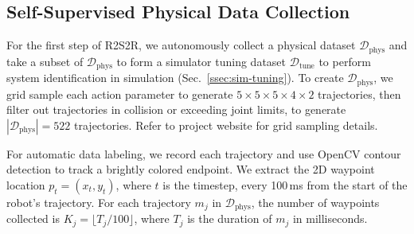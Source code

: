 \documentclass[letterpaper, 10pt, conference]{ieeeconf}  %
\newcommand{\vmax}{v_{\rm max}}
\newcommand{\dtune}{\mathcal{D}_\textrm{tune}}
\newcommand{\dsim}{\mathcal{D}_\textrm{sim}}
\newcommand{\dreal}{\mathcal{D}_\textrm{phys}}
\newcommand{\remark}[3]{{\color{#2}[#1: #3]}}
\newcommand{\Vincent}[1]{\remark{Vincent}{purple}{#1}}
\newcommand{\Lawrence}[1]{\remark{Lawrence}{orange}{#1}}
\begin{document}
\subsection{Self-Supervised Physical Data Collection} \label{ssec:phys-data}

For the first step of R2S2R, we autonomously collect a physical dataset $\dreal$ and take a subset of $\dreal$ to form a simulator tuning dataset $\dtune$ to perform system identification in simulation (Sec.~\ref{ssec:sim-tuning}). %
To create $\dreal$, we grid sample each action parameter to generate $5{\times}5{\times}5{\times}4{\times}2$ trajectories, then filter out trajectories in collision or exceeding joint limits,
to generate $|\dreal|=522$ trajectories. Refer to project website for grid sampling details. 

For automatic data labeling, we record each trajectory and use OpenCV contour detection  \cite{opencv_library} to track a brightly colored endpoint. We extract the 2D waypoint location $p_t = (x_t, y_t)$, where $t$ is the timestep, every 100\,ms from the start of the robot's trajectory. For each trajectory $m_j$ in $\dreal$, the number of waypoints collected is $K_j = \lfloor {T_j}/{100} \rfloor$, where $T_j$ is the duration of $m_j$ in milliseconds. 
\end{document}
